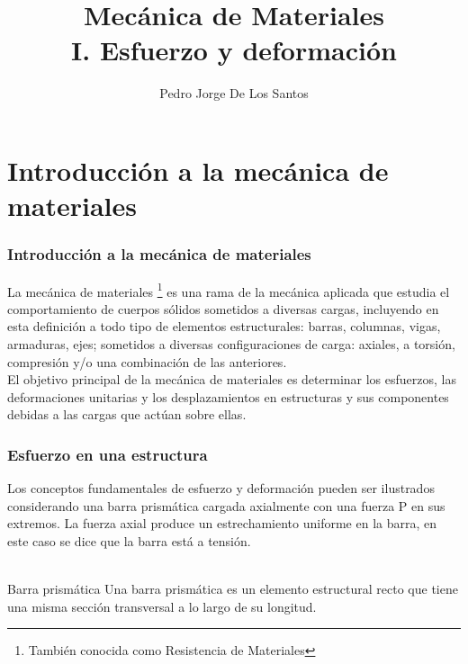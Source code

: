 \documentclass{beamer}
\title{
{\Large Mecánica de Materiales} \\
{\large I. Esfuerzo y deformación}
}
\author{Pedro Jorge De Los Santos}
\institute{
    {\bf 
    Instituto Tecnológico de Celaya \\
    Departamento de Ingeniería Mecánica \\
    }
}
\begin{document}
\begin{frame}
\titlepage
\end{frame}

\section{Introducción a la mecánica de materiales}

\begin{frame}
\justifying
\frametitle{Introducción a la mecánica de materiales}


La mecánica de materiales \footnote{También conocida como Resistencia de Materiales} es una rama de la 
mecánica aplicada que estudia el comportamiento de cuerpos sólidos sometidos a diversas cargas, incluyendo 
en esta definición a todo tipo de elementos estructurales: barras, columnas, vigas, armaduras, ejes; sometidos a 
diversas configuraciones de carga: axiales, a torsión, compresión y/o una combinación de las anteriores. \\

El objetivo principal de la mecánica de materiales es determinar los esfuerzos, las deformaciones 
unitarias y los desplazamientos en estructuras y sus componentes debidas a las cargas que actúan sobre 
ellas. \\

\end{frame}


\begin{frame}
\frametitle{Esfuerzo en una estructura}
\justifying

Los conceptos fundamentales de esfuerzo y deformación pueden ser ilustrados considerando una barra 
prismática cargada axialmente con una fuerza P en sus extremos.  La fuerza axial 
produce un estrechamiento uniforme en la barra, en este caso se dice que la barra está a tensión. \\

\hfill \\

\begin{informacion}{Barra prismática}
Una barra prismática es un elemento 
estructural recto que tiene una misma sección transversal a lo largo de su longitud.
\end{informacion}

\end{frame}
\end{document}
